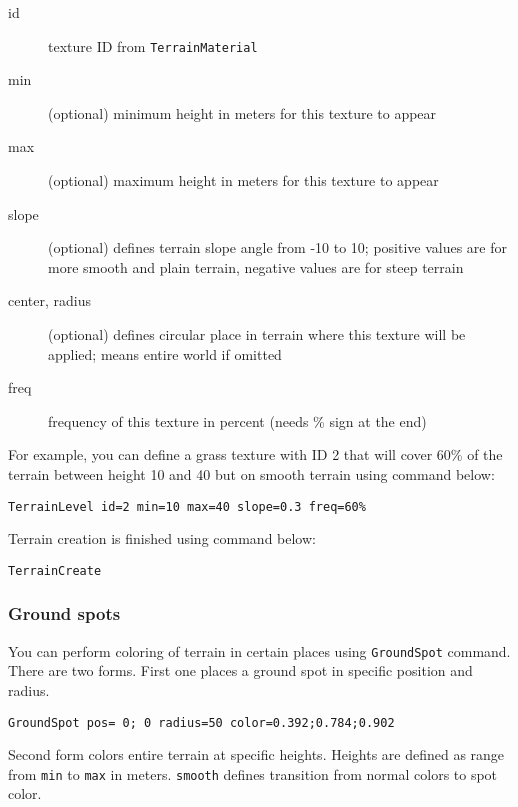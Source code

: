 \begin{description}
    \item[id] texture ID from \texttt{TerrainMaterial}
    \item[min] (optional) minimum height in meters for this texture to appear
    \item[max] (optional) maximum height in meters for this texture to appear
    \item[slope] (optional) defines terrain slope angle from -10 to 10; positive values are for more smooth and plain terrain, negative values are for steep terrain
    \item[center, radius] (optional) defines circular place in terrain where this texture will be applied; means entire world if omitted
    \item[freq] frequency of this texture in percent (needs \% sign at the end)
\end{description}

For example, you can define a grass texture with ID 2 that will cover 60\% of the terrain between height 10 and 40 but on smooth terrain using command below:

\begin{lstlisting}[style=scene]
TerrainLevel id=2 min=10 max=40 slope=0.3 freq=60%
\end{lstlisting}

Terrain creation is finished using command below:

\begin{lstlisting}[style=scene]
TerrainCreate
\end{lstlisting}


\subsubsection{Ground spots}

You can perform coloring of terrain in certain places using \texttt{GroundSpot} command. There are two forms. First one places a ground spot in specific position and radius.

\begin{lstlisting}[style=scene]
GroundSpot pos= 0; 0 radius=50 color=0.392;0.784;0.902
\end{lstlisting}

Second form colors entire terrain at specific heights. Heights are defined as range from \texttt{min} to \texttt{max} in meters. \texttt{smooth} defines transition from normal colors to spot color.

